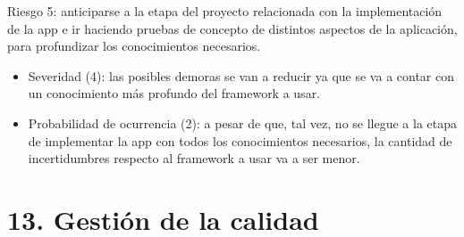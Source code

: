 \documentclass[
11pt, %
]{charter}
\begin{document}
Riesgo 5: anticiparse a la etapa del proyecto relacionada con la implementación de la app e ir haciendo pruebas de concepto de distintos aspectos de la aplicación,  para profundizar los conocimientos necesarios.
\begin{itemize}
  \item Severidad (4): las posibles demoras se van a reducir ya que se va a contar con un conocimiento más profundo del framework a usar.
  \item Probabilidad de ocurrencia (2): a pesar de que, tal vez, no se llegue a la etapa de implementar la app con todos los conocimientos necesarios, la cantidad de incertidumbres respecto al framework a usar va a ser menor. 
\end{itemize} 



\section{13. Gestión de la calidad}
\label{sec:calidad}

\end{document}
